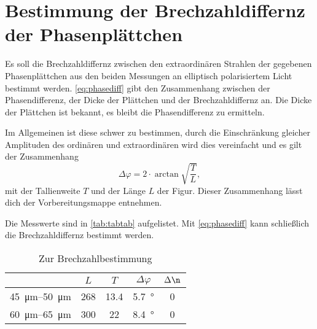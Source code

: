 \chapter{Bestimmung der Brechzahldiffernz der Phasenplättchen}

Es soll die Brechzahldiffernz zwischen den extraordinären Strahlen der gegebenen Phasenplättchen aus den beiden Messungen an elliptisch polarisiertem Licht bestimmt werden.
\autoref{eq:phasediff} gibt den Zusammenhang zwischen der Phasendifferenz, der Dicke der Plättchen und der Brechzahldiffernz an.
Die Dicke der Plättchen ist bekannt, es bleibt die Phasendifferenz zu ermitteln.

Im Allgemeinen ist diese schwer zu bestimmen, durch die Einschränkung gleicher Amplituden des ordinären und extraordinären wird dies vereinfacht und es gilt der Zusammenhang
\begin{equation}
	\Delta \varphi = 2 \cdot \arctan\sqrt{\frac{T}{L}},
\end{equation}
mit der Tallienweite $T$ und der Länge $L$ der Figur.
Dieser Zusammenhang lässt dich der Vorbereitungsmappe entnehmen.

Die Messwerte sind in \autoref{tab:tabtab} aufgelistet.
Mit \autoref{eq:phasediff} kann schließlich die Brechzahldiffernz bestimmt werden.


\begin{table}
	\centering
	\caption{Zur Brechzahlbestimmung}
	\label{tab:tabtab}
	\begin{tabular}{ccccc}
	\toprule
	&	{$L$}&	{$T$}&	{$\Delta \varphi$}&	{$\Delta \n$}\\
	\midrule
	\SIrange{45}{50}{\micro\meter}& 268&	\num{13.4}&	\SI{5.7}{\degree}& \num{0}\\
	\SIrange{60}{65}{\micro\meter}& 300&	22&	\SI{8.4}{\degree}& \num{0}\\
	\bottomrule
	\end{tabular}
\end{table}

